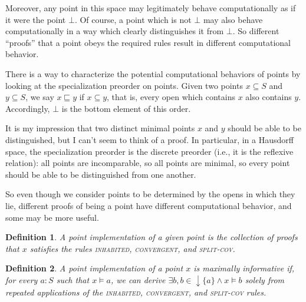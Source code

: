 \documentclass{article}           %
\newtheorem{definition}{Definition}
\newcommand{\irule}[1]{\textsc{#1}}
\begin{document}
Moreover, any point in this space may legitimately behave computationally as if it were the point $\bot$. Of course, a point which is not $\bot$ may also behave computationally in a way which clearly distinguishes it from $\bot$. So different ``proofs'' that a point obeys the required rules result in different computational behavior.

There is a way to characterize the potential computational behaviors of points by looking at the specialization preorder on points. Given two points $x \subseteq S$ and $y \subseteq S$, we say $x \sqsubseteq y$ if $x \subseteq y$, that is, every open which contains $x$ also contains $y$. Accordingly, $\bot$ is the bottom element of this order.

It is my impression that two distinct minimal points $x$ and $y$ should be able to be distinguished, but I can't seem to think of a proof. In particular, in a Hausdorff space, the specialization preorder is the discrete preorder (i.e., it is the reflexive relation): all points are incomparable, so all points are minimal, so every point should be able to be distinguished from one another.

So even though we consider points to be determined by the opens in which they lie, different proofs of being a point have different computational behavior, and some may be more useful.

\begin{definition} A \emph{point implementation} of a given point is the collection of proofs that $x$ satisfies the rules \irule{inhabited}, \irule{convergent}, and \irule{split-cov}.
\end{definition}

\begin{definition}
A point implementation of a point $x$ is \emph{maximally informative} if, for every $a : S$ such that $x \models a$, we can derive $\exists b, b \in \downarrow \{ a \} \wedge x \models b$ solely from repeated applications of the \irule{inhabited}, \irule{convergent}, and \irule{split-cov} rules.
\end{definition}
\end{document}
